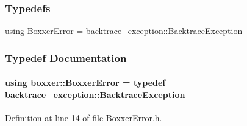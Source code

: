 \subsubsection*{Typedefs}
\begin{DoxyCompactItemize}
\item 
using \hyperlink{namespaceboxxer_a32d05a7ef7b6f96d0a730455c84e4d31}{Boxxer\+Error} = backtrace\+\_\+exception\+::\+Backtrace\+Exception
\end{DoxyCompactItemize}


\subsubsection{Typedef Documentation}
\paragraph[{\texorpdfstring{Boxxer\+Error}{BoxxerError}}]{\setlength{\rightskip}{0pt plus 5cm}using {\bf boxxer\+::\+Boxxer\+Error} = typedef backtrace\+\_\+exception\+::\+Backtrace\+Exception}\hypertarget{namespaceboxxer_a32d05a7ef7b6f96d0a730455c84e4d31}{}\label{namespaceboxxer_a32d05a7ef7b6f96d0a730455c84e4d31}


Definition at line 14 of file Boxxer\+Error.\+h.

